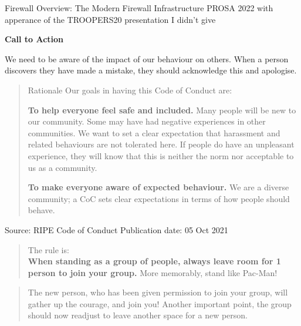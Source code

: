 \documentclass[Screen16to9,17pt]{foils}
\begin{document}
\mytitlepage
{Firewall Overview: The Modern Firewall Infrastructure}
{PROSA 2022 with apperance of the TROOPERS20 presentation I didn't give}


\hlkprofiluk


{\bf \LARGE Call to Action}

We need to be aware of the impact of our behaviour on others. When a person discovers they have made a mistake, they should acknowledge this and apologise.

\begin{quote}
Rationale
Our goals in having this Code of Conduct are:
\begin{list2}
\item {\bf To help everyone feel safe and included.} Many people will be new to our community. Some may have had negative experiences in other communities. We want to set a clear expectation that harassment and related behaviours are not tolerated here. If people do have an unpleasant experience, they will know that this is neither the norm nor acceptable to us as a community.

\item {\bf To make everyone aware of expected behaviour.} We are a diverse community; a CoC sets clear expectations in terms of how people should behave.
\end{list2}
\end{quote}

Source: {\small RIPE Code of Conduct Publication date: 05 Oct 2021
}



\begin{quote}
\vskip -1cm The rule is:\\
{\bf When standing as a group of people, always leave room for 1 person to join your group.} \hskip 3cm More memorably, stand like Pac-Man!
\end{quote}


\begin{quote}
The new person, who has been given permission to join your group, will gather up the courage, and join you! Another important point, the group should now readjust to leave another space for a new person.\\
\end{quote}
\end{document}
